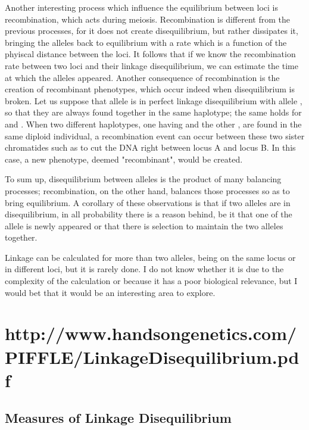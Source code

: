 \documentclass[../main.tex]{subfiles}
\begin{document}
Another interesting process which influence the equilibrium between loci 
is recombination, which acts during meiosis. Recombination is different 
from the previous processes, for it does not create disequilibrium, but 
rather dissipates it, bringing the alleles back to equilibrium with a 
rate which is a function of the phyiscal distance between the loci. It 
follows that if we know the recombination rate between two loci and 
their linkage disequilibrium, we can estimate the time at which the 
alleles appeared. Another consequence of recombination is the creation 
of recombinant phenotypes, which occur indeed when disequilibrium is 
broken. Let us suppose that allele  is in perfect linkage 
disequilibrium with allele , so that they are always found 
together in the same haplotype; the same holds for  and 
. When two different haplotypes, one having  and the 
other , are found in the same diploid individual, a 
recombination event can occur between these two sister chromatides such 
as to cut the DNA right between locus A and locus B. In this case, a new 
phenotype, deemed "recombinant", would be created.

To sum up, disequilibrium between alleles is the product of many 
balancing processes; recombination, on the other hand, balances those 
processes so as to bring equilibrium. A corollary of these observations 
is that if two alleles are in disequilibrium, in all probability there 
is a reason behind, be it that one of the allele is newly appeared or 
that there is selection to maintain the two alleles together.

Linkage can be calculated for more than two alleles, being on the same 
locus or in different loci, but it is rarely done. I do not know whether 
it is due to the complexity of the calculation or because it has a poor 
biological relevance, but I would bet that it would be an interesting 
area to explore.



\section{http://www.handsongenetics.com/PIFFLE/LinkageDisequilibrium.pdf}


\subsection{Measures of Linkage Disequilibrium}
\end{document}
